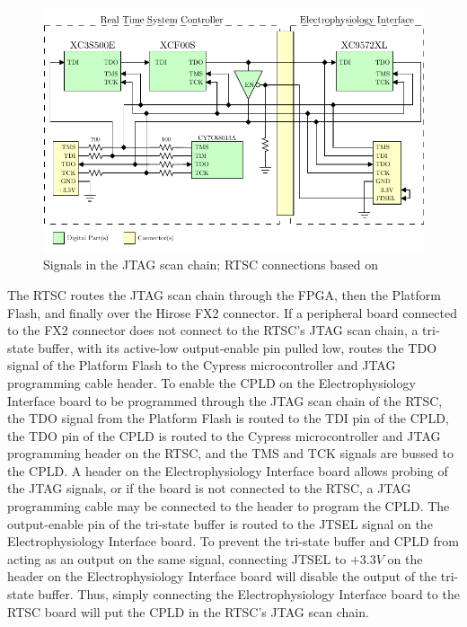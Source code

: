 \begin{figure}[H]
	\centering 
		\includegraphics{./figures/JTAGChain} 
	\caption{Signals in the JTAG scan chain; RTSC connections based on~\cite{DigilentNexys2sch}\label{fig:JTAGChain}}
\end{figure}

The RTSC routes the JTAG scan chain through the FPGA, then the Platform Flash, and finally over the Hirose FX2 connector.  If a peripheral board connected to the FX2 connector does not connect to the RTSC's JTAG scan chain, a tri-state buffer, with its active-low output-enable pin pulled low, routes the TDO signal of the Platform Flash to the Cypress microcontroller and JTAG programming cable header.  To enable the CPLD on the Electrophysiology Interface board to be programmed through the JTAG scan chain of the RTSC, the TDO signal from the Platform Flash is routed to the TDI pin of the CPLD, the TDO pin of the CPLD is routed to the Cypress microcontroller and JTAG programming header on the RTSC, and the TMS and TCK signals are bussed to the CPLD.  A header on the Electrophysiology Interface board allows probing of the JTAG signals, or if the board is not connected to the RTSC, a JTAG programming cable may be connected to the header to program the CPLD.  The output-enable pin of the tri-state buffer is routed to the JTSEL signal on the Electrophysiology Interface board.  To prevent the tri-state buffer and CPLD from acting as an output on the same signal, connecting JTSEL to $+3.3\unit{V}$ on the header on the Electrophysiology Interface board will disable the output of the tri-state buffer.  Thus, simply connecting the Electrophysiology Interface board to the RTSC board will put the CPLD in the RTSC's JTAG scan chain.

